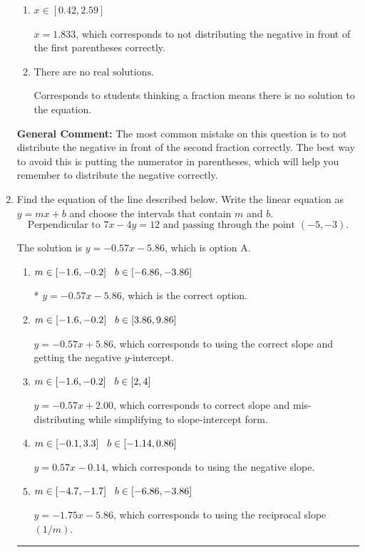 \documentclass{extbook}[14pt]
\newcommand{\litem}[1]{\item #1

\rule{\textwidth}{0.4pt}}
\begin{document}
\begin{enumerate}
{\begin{enumerate}[label=\Alph*.]
* $x = -1.214$, which is the correct option.
\item \( x \in [0.42, 2.59] \)

$x = 1.833$, which corresponds to not distributing the negative in front of the first parentheses correctly.
\item \( \text{There are no real solutions.} \)

Corresponds to students thinking a fraction means there is no solution to the equation.
\end{enumerate}

\textbf{General Comment:} The most common mistake on this question is to not distribute the negative in front of the second fraction correctly. The best way to avoid this is putting the numerator in parentheses, which will help you remember to distribute the negative correctly.
}
\litem{
Find the equation of the line described below. Write the linear equation as $ y=mx+b $ and choose the intervals that contain $m$ and $b$.
\[ \text{Perpendicular to } 7 x - 4 y = 12 \text{ and passing through the point } (-5, -3). \]

The solution is \( y = -0.57x - 5.86 \), which is option A.\begin{enumerate}[label=\Alph*.]
\item \( m \in [-1.6, -0.2] \hspace*{3mm} b \in [-6.86, -3.86] \)

* $y = -0.57x - 5.86$, which is the correct option.
\item \( m \in [-1.6, -0.2] \hspace*{3mm} b \in [3.86, 9.86] \)

 $y = -0.57x + 5.86$, which corresponds to using the correct slope and getting the negative $y$-intercept.
\item \( m \in [-1.6, -0.2] \hspace*{3mm} b \in [2, 4] \)

 $y = -0.57x + 2.00$, which corresponds to correct slope and mis-distributing while simplifying to slope-intercept form.
\item \( m \in [-0.1, 3.3] \hspace*{3mm} b \in [-1.14, 0.86] \)

 $y = 0.57x - 0.14$, which corresponds to using the negative slope.
\item \( m \in [-4.7, -1.7] \hspace*{3mm} b \in [-6.86, -3.86] \)

 $y = -1.75x - 5.86$, which corresponds to using the reciprocal slope $(1/m)$.
\end{enumerate}

}
\end{enumerate}
\end{document}

